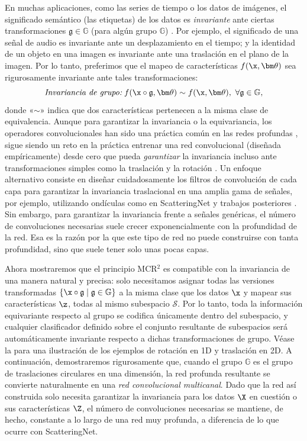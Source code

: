 \documentclass[../../book-main.tex]{subfiles}
\begin{document}
En muchas aplicaciones, como las series de tiempo o los datos de imágenes, el
significado semántico (las etiquetas) de los datos es  {\em invariante} ante ciertas
transformaciones $\mathfrak{g} \in \mathbb{G}$ (para algún grupo
$\mathbb{G}$) \cite{CohenW16,deep-sets-NIPS2017}. Por ejemplo, el
significado de una señal de audio es invariante ante un desplazamiento en el tiempo; y la
identidad de un objeto en una imagen es invariante ante una traslación en el
plano de la imagen. Por lo tanto, preferimos que el mapeo de características $f(\x,\bm \theta)$
sea rigurosamente invariante ante tales transformaciones:
\begin{equation}
    \mbox{\em Invariancia de grupo:}\;   f(\x\circ \mathfrak{g}, \bm
    \theta) \sim f(\x,\bm \theta),\ \forall \mathfrak{g} \in \mathbb{G},
\end{equation}
donde «$\sim$» indica que dos características pertenecen a la misma 
clase de equivalencia. Aunque para garantizar la invariancia o la equivariancia,
los operadores convolucionales han sido una práctica común en las redes profundas
\cite{CohenW16}, sigue siendo un reto en la práctica entrenar una
red convolucional (diseñada empíricamente) desde cero que pueda {\em
garantizar} la invariancia incluso ante transformaciones simples como
la traslación y la rotación \cite{azulay2018deep,engstrom2017rotation}.
Un enfoque alternativo consiste en diseñar cuidadosamente los filtros de convolución de
cada capa para garantizar la invariancia traslacional en una amplia gama
de señales, por ejemplo, utilizando ondículas como en ScatteringNet
\cite{scattering-net} y trabajos posteriores \cite{Wiatowski-2018}.
Sin embargo, para garantizar la invariancia frente a señales genéricas, el número
de convoluciones necesarias suele crecer exponencialmente con la profundidad
de la red. Esa es la razón por la que este tipo de red no puede
construirse con tanta profundidad, sino que suele tener solo unas pocas capas.

Ahora mostraremos que el principio MCR$^2$ es compatible con la invariancia
de una manera natural y precisa: solo necesitamos asignar todas las versiones transformadas
$\{\x\circ \mathfrak{g} \mid \mathfrak{g} \in \mathbb G\}$
a la misma clase que los datos $\x$ y mapear sus características $\z$, todas al mismo 
subespacio $\mathcal S$. Por lo tanto, toda la información equivariante
respecto al grupo se codifica únicamente dentro del subespacio, y cualquier clasificador
definido sobre el conjunto resultante de subespacios será automáticamente
invariante respecto a dichas transformaciones de grupo. Véase la
 para una ilustración de los
ejemplos de rotación en 1D y traslación en 2D. A continuación, demostraremos rigurosamente
que, cuando el grupo $\mathbb G$ es el grupo de traslaciones circulares en una dimensión, la
red profunda resultante se convierte naturalmente en una {\em red convolucional
multicanal}.
Dado que la red así construida solo necesita garantizar la invariancia
para los datos $\X$ en cuestión o sus características $\Z$, el número de
convoluciones necesarias se mantiene, de hecho, constante a lo largo de una red muy profunda,
a diferencia de lo que ocurre con ScatteringNet.
\end{document}

